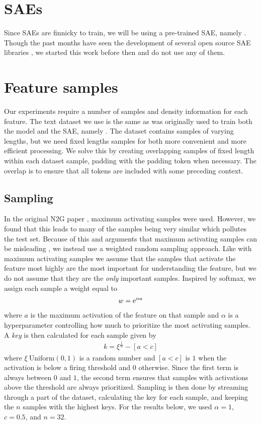


\section{SAEs}
Since SAEs are finnicky to train, we will be using a pre-trained SAE, namely .
Though the past months have seen the development of several open source SAE libraries , we started this work before then and do not use any of them.

\section{Feature samples}
Our experiments require a number of samples and density information for each feature.
The text dataset we use is the same as was originally used to train both the model and the SAE, namely .
The dataset contains samples of varying lengths, but we need fixed lengths samples for both more convenient and more efficient processing.
We solve this by creating overlapping samples of fixed length within each dataset sample, padding with the padding token when necessary.
The overlap is to ensure that all tokens are included with some preceding context.

\subsection{Sampling}
In the original N2G paper , maximum activating samples were used.
However, we found that this leads to many of the samples being very similar which pollutes the test set.
Because of this and arguments that maximum activating samples can be misleading , we instead use a weighted random sampling approach.
Like with maximum activating samples we assume that the samples that activate the feature most highly are the most important for understanding the feature, but we do not assume that they are the \emph{only} important samples.
Inspired by softmax, we assign each sample a weight equal to
\begin{align*}
    w=\mathrm{e}^{\alpha a}
\end{align*}
where $a$ is the maximum activation of the feature on that sample and $\alpha$ is a hyperparameter controlling how much to prioritize the most activating samples.
A \emph{key} is then calculated for each sample given by
\begin{align*}
    k=\xi^{\frac1w}-[a<c]
\end{align*}
where $\xi~\mathrm{Uniform}(0,1)$ is a random number and $[a<c]$ is $1$ when the activation is below a firing threshold and $0$ otherwise.
Since the first term is always between $0$ and $1$, the second term ensures that samples with activations above the threshold are always prioritized.
Sampling is then done by streaming through a part of the dataset, calculating the key for each sample, and keeping the $n$ samples with the highest keys.
For the results below, we used $\alpha=1$, $c=0.5$, and $n=32$.

